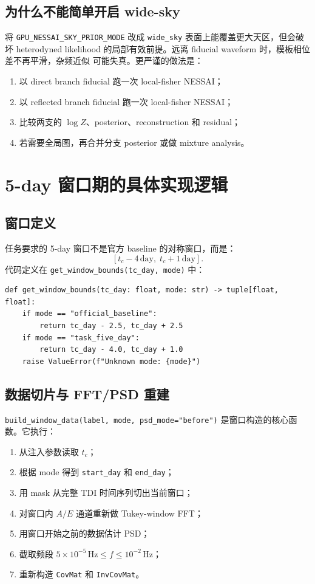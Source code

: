 \documentclass[11pt,a4paper]{ctexart}
\begin{document}
\subsection{为什么不能简单开启 wide-sky}

将 \texttt{GPU\_NESSAI\_SKY\_PRIOR\_MODE} 改成 \texttt{wide\_sky} 表面上能覆盖更大天区，但会破坏
heterodyned likelihood 的局部有效前提。远离 fiducial waveform 时，模板相位差不再平滑，杂频近似
可能失真。更严谨的做法是：
\begin{enumerate}
  \item 以 direct branch fiducial 跑一次 local-fisher NESSAI；
  \item 以 reflected branch fiducial 跑一次 local-fisher NESSAI；
  \item 比较两支的 \(\log Z\)、posterior、reconstruction 和 residual；
  \item 若需要全局图，再合并分支 posterior 或做 mixture analysis。
\end{enumerate}

\section{5-day 窗口期的具体实现逻辑}

\subsection{窗口定义}

任务要求的 5-day 窗口不是官方 baseline 的对称窗口，而是：
\[
[t_c-4\,\mathrm{day},\;t_c+1\,\mathrm{day}].
\]
代码定义在 \texttt{get\_window\_bounds(tc\_day, mode)} 中：
\begin{lstlisting}[style=pycode]
def get_window_bounds(tc_day: float, mode: str) -> tuple[float, float]:
    if mode == "official_baseline":
        return tc_day - 2.5, tc_day + 2.5
    if mode == "task_five_day":
        return tc_day - 4.0, tc_day + 1.0
    raise ValueError(f"Unknown mode: {mode}")
\end{lstlisting}

\subsection{数据切片与 FFT/PSD 重建}

\texttt{build\_window\_data(label, mode, psd\_mode="before")} 是窗口构造的核心函数。它执行：
\begin{enumerate}
  \item 从注入参数读取 \(t_c\)；
  \item 根据 mode 得到 \texttt{start\_day} 和 \texttt{end\_day}；
  \item 用 mask 从完整 TDI 时间序列切出当前窗口；
  \item 对窗口内 \(A/E\) 通道重新做 Tukey-window FFT；
  \item 用窗口开始之前的数据估计 PSD；
  \item 截取频段 \(5\times10^{-5}\,\mathrm{Hz}\le f\le10^{-2}\,\mathrm{Hz}\)；
  \item 重新构造 \texttt{CovMat} 和 \texttt{InvCovMat}。
\end{enumerate}
\end{document}
